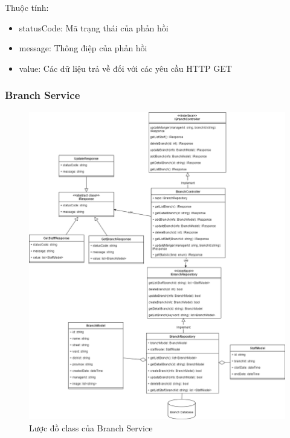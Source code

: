Thuộc tính:
\begin{itemize}
	\item statusCode: Mã trạng thái của phản hồi
	\item message: Thông điệp của phản hồi
	\item value: Các dữ liệu trả về đối với các yêu cầu HTTP GET
\end{itemize}

\newpage


\subsubsection{Branch Service}
\begin{figure}[!htp]
	\centering
	\includegraphics[width=13cm]{img/Architecture/service/BranchService.png}
	\newline
	\caption{Lược đồ class của Branch Service}
\end{figure}

